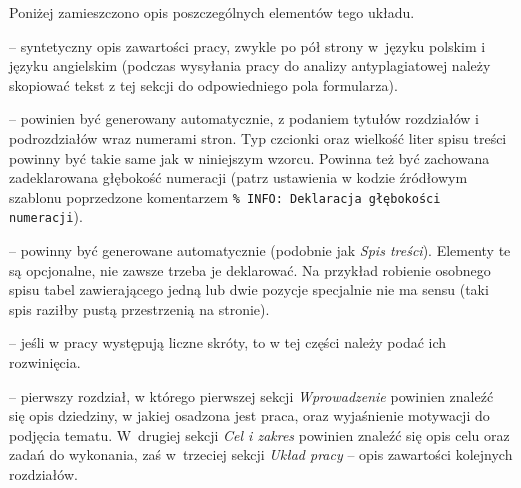 Poniżej zamieszczono opis poszczególnych elementów tego układu.
\begin{description}[font=\normalfont\itshape,leftmargin=1.em,itemindent=1.em,labelwidth=1.5em]
\item[Streszczenie] -- syntetyczny opis zawartości pracy, zwykle po pół strony w~języku polskim i języku angielskim (podczas wysyłania pracy do analizy antyplagiatowej należy skopiować tekst z tej sekcji do odpowiedniego pola formularza).
\item[Spis treści] -- powinien być generowany automatycznie, z podaniem tytułów rozdziałów i podrozdziałów wraz numerami stron. Typ czcionki oraz wielkość liter spisu treści powinny być takie same jak w niniejszym wzorcu. Powinna też być zachowana zadeklarowana głębokość numeracji (patrz ustawienia w kodzie źródłowym szablonu poprzedzone komentarzem \texttt{\% INFO: Deklaracja głębokości numeracji}).
\item[Spis rysunków, Spis tabel, Spis listingów] -- powinny być generowane automatycznie (podobnie jak \emph{Spis treści}). Elementy te są opcjonalne, nie zawsze trzeba je deklarować. Na przykład robienie osobnego spisu tabel zawierającego jedną lub dwie pozycje specjalnie nie ma sensu (taki spis raziłby pustą przestrzenią na stronie).
\item[Skróty] -- jeśli w pracy występują liczne skróty, to w tej części należy podać ich rozwinięcia.
\item[Wstęp] -- pierwszy rozdział, w którego pierwszej sekcji \emph{Wprowadzenie} powinien znaleźć się opis dziedziny, w jakiej osadzona jest praca, oraz wyjaśnienie motywacji do podjęcia tematu. W~drugiej sekcji \emph{Cel i zakres} powinien znaleźć się opis celu oraz zadań do wykonania, zaś w~trzeciej sekcji \emph{Układ pracy} -- opis zawartości kolejnych rozdziałów.


\end{description}
